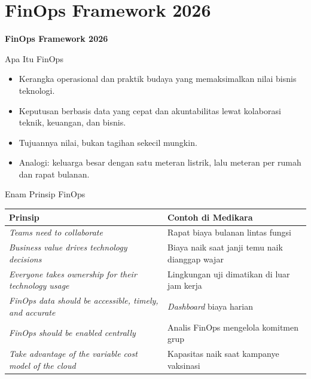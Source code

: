 \documentclass[aspectratio=169, table, 12pt]{beamer}
\begin{document}
\section{FinOps Framework 2026}

\begin{frame}{\hfill}
  \centering
  \Huge{\textbf{FinOps Framework 2026}}
\end{frame}

\begin{frame}{{\Large Apa Itu FinOps}}
  \vspace{10pt}
  \begin{itemize}
    \item Kerangka operasional dan praktik budaya yang memaksimalkan nilai
          bisnis teknologi.
    \item Keputusan berbasis data yang cepat dan akuntabilitas lewat
          kolaborasi teknik, keuangan, dan bisnis.
    \item Tujuannya nilai, bukan tagihan sekecil mungkin.
    \item Analogi: keluarga besar dengan satu meteran listrik, lalu meteran
          per rumah dan rapat bulanan.
  \end{itemize}
\end{frame}

\begin{frame}{{\Large Enam Prinsip FinOps}}
  \footnotesize
  \begin{tabularx}{\textwidth}{>{\raggedright\arraybackslash}p{6.6cm}
      >{\raggedright\arraybackslash}X}
    \hline
    \textbf{Prinsip} & \textbf{Contoh di Medikara} \\
    \hline
    \textit{Teams need to collaborate} & Rapat biaya bulanan lintas fungsi \\
    \hline
    \textit{Business value drives technology decisions} & Biaya naik saat janji
      temu naik dianggap wajar \\
    \hline
    \textit{Everyone takes ownership for their technology usage} & Lingkungan
      uji dimatikan di luar jam kerja \\
    \hline
    \textit{FinOps data should be accessible, timely, and accurate}
      & \textit{Dashboard} biaya harian \\
    \hline
    \textit{FinOps should be enabled centrally} & Analis FinOps mengelola
      komitmen grup \\
    \hline
    \textit{Take advantage of the variable cost model of the cloud} & Kapasitas
      naik saat kampanye vaksinasi \\
    \hline
  \end{tabularx}
\end{frame}
\end{document}
